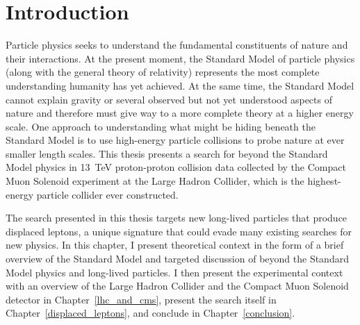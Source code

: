 \chapter{Introduction}
\label{intro}
Particle physics seeks to understand the fundamental constituents of nature and their interactions. At the present moment, the Standard Model of particle physics (along with the general theory of relativity) represents the most complete understanding humanity has yet achieved. At the same time, the Standard Model cannot explain gravity or several observed but not yet understood aspects of nature and therefore must give way to a more complete theory at a higher energy scale. One approach to understanding what might be hiding beneath the Standard Model is to use high-energy particle collisions to probe nature at ever smaller length scales. This thesis presents a search for beyond the Standard Model physics in \SI{13}{\TeV} proton-proton collision data collected by the Compact Muon Solenoid experiment at the Large Hadron Collider, which is the highest-energy particle collider ever constructed.

The search presented in this thesis targets new long-lived particles that produce displaced leptons, a unique signature that could evade many existing searches for new physics. In this chapter, I present theoretical context in the form of a brief overview of the Standard Model and targeted discussion of beyond the Standard Model physics and long-lived particles. I then present the experimental context with an overview of the Large Hadron Collider and the Compact Muon Solenoid detector in Chapter~\ref{lhc_and_cms}, present the search itself in Chapter~\ref{displaced_leptons}, and conclude in Chapter~\ref{conclusion}. 



